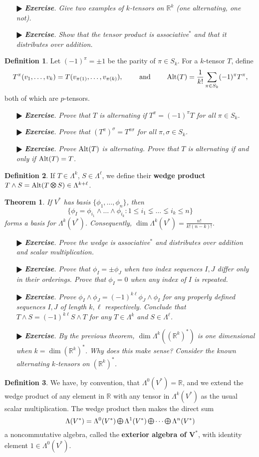\documentclass[11pt]{amsart}
\newtheorem*{theorem*}{Theorem}
\theoremstyle{definition}
\newtheorem*{definition*}{Definition}
\renewcommand\leq{\leqslant}
\renewcommand\:{\colon}
\newcommand{\R}{\mathds{R}}
\newcommand{\1}{\mathds{1}}
\newcommand{\Alt}{\textnormal{Alt}}
\DeclareMathOperator*{\Moplus}{\text{\raisebox{0.35ex}{\scalebox{0.6}{$\bigoplus$}}}}
\DeclareMathOperator*{\motimes}{\text{\raisebox{0.25ex}{\scalebox{0.8}{$\bigotimes$}}}}
\newcommand{\exc}[1]{\vspace{-2.5pt}\begin{itemize}[leftmargin=15pt]\item[$\RHD$] \textit{\textbf{Exercise}. #1}\end{itemize}}
\begin{document}
\exc{Give two examples of $k$-tensors on $\R^k$ (one alternating, one not).}
\exc{Show that the tensor product is associative$^*$ and that it distributes over addition.}

\begin{definition*}
	Let $(-1)^\pi = \pm 1$ be the parity of $\pi \in S_k$. For a $k$-tensor $T$, define
		\[ T^\pi(v_1, \dots, v_k) = T(v_{\pi(1)}, \dots, v_{\pi(k)}), \hskip20pt \text{ and } \hskip20pt \Alt(T) = \frac1{k!} \sum_{\pi \in S_k} (-1)^\pi T^\pi, \]
	both of which are $p$-tensors.
\end{definition*}

\exc{Prove that $T$ is alternating if $T^\pi = (-1)^\pi T$ for all $\pi \in S_k$.}
\exc{Prove that $(T^\pi)^\sigma = T^{\pi\sigma}$ for all $\pi, \sigma \in S_k$.}
\exc{Prove $\Alt(T)$ is alternating. Prove that $T$ is alternating if and only if $\Alt(T) = T$.}

\begin{definition*}
	If $T \in \Lambda^k$, $S \in \Lambda^\ell$, we define their \textbf{wedge product} $T \wedge S = \Alt(T \motimes S) \in \Lambda^{k + \ell}$.
\end{definition*}

\begin{theorem*}
	If $V^*$ has basis $\{\phi_1, \dots, \phi_n\}$, then 
		\[ \{\phi_I = \phi_{i_1} \wedge \dots \wedge \phi_{i_k} : 1 \leq i_1 \lneq \dots \lneq i_k \leq n\} \]
	forms a basis for $\Lambda^k(V^*)$. Consequently, $\dim\Lambda^k(V^*) = \frac{n!}{k!(n - k)!}$.
\end{theorem*}


\exc{Prove the wedge is associative$^*$ and distributes over addition and scalar multiplication.}
\exc{Prove that $\phi_I = \pm\phi_J$ when two index sequences $I, J$ differ only in their orderings. Prove that $\phi_I = 0$ when any index of $I$ is repeated.}
\exc{Prove $\phi_I \wedge \phi_J = (-1)^{k\ell} \phi_J \wedge \phi_I$ for any properly defined sequences $I, J$ of length $k, \ell$ respectively. Conclude that $T \wedge S = (-1)^{k\ell} S \wedge T$ for any $T \in \Lambda^k$ and $S \in \Lambda^\ell$.}
\exc{By the previous theorem, $\dim \Lambda^k((\R^k)^*)$ is one dimensional when $k = \dim (\R^k)^*$. Why does this make sense? Consider the known alternating $k$-tensors on $(\R^k)^*$.}

\begin{definition*}
	We have, by convention, that $\Lambda^0(V^*) = \R$, and we extend the wedge product of any element in $\R$ with any tensor in $\Lambda^k(V^*)$ as the usual scalar multiplication. The wedge product then makes the direct sum
		\[ \Lambda(V^*) = \Lambda^0(V^*) \Moplus \Lambda^1(V^*) \Moplus \cdots \Moplus \Lambda^n(V^*) \]
	a noncommutative algebra, called the \textbf{exterior algebra of $\boldsymbol{V^*}$}, with identity element $1 \in \Lambda^0(V^*)$.
\end{definition*}
\vskip20pt
\end{document}

